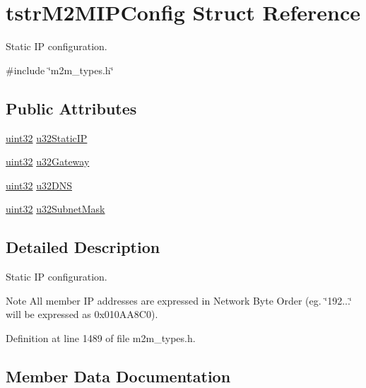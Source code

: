 \hypertarget{structtstrM2MIPConfig}{}\section{tstr\+M2\+M\+I\+P\+Config Struct Reference}
\label{structtstrM2MIPConfig}


Static IP configuration.  




{\ttfamily \#include \char`\"{}m2m\+\_\+types.\+h\char`\"{}}

\subsection*{Public Attributes}
\begin{DoxyCompactItemize}
\item 
\hyperlink{group__DataT_ga100e7c691a47d6978527c479a0158245}{uint32} \hyperlink{structtstrM2MIPConfig_ad98262f0684c0e7a2ab01e8f3e2cce05}{u32\+Static\+IP}
\item 
\hyperlink{group__DataT_ga100e7c691a47d6978527c479a0158245}{uint32} \hyperlink{structtstrM2MIPConfig_ad42bb813617dd8883f434f242ccebf8a}{u32\+Gateway}
\item 
\hyperlink{group__DataT_ga100e7c691a47d6978527c479a0158245}{uint32} \hyperlink{structtstrM2MIPConfig_a45db4ce212dc54ed9b9247316871ae17}{u32\+D\+NS}
\item 
\hyperlink{group__DataT_ga100e7c691a47d6978527c479a0158245}{uint32} \hyperlink{structtstrM2MIPConfig_aeda2788391789636614f7d125b609f00}{u32\+Subnet\+Mask}
\end{DoxyCompactItemize}


\subsection{Detailed Description}
Static IP configuration. 

\begin{DoxyNote}{Note}
All member IP addresses are expressed in Network Byte Order (eg. \char`\"{}192...\char`\"{} will be expressed as 0x010\+A\+A8\+C0). 
\end{DoxyNote}


Definition at line 1489 of file m2m\+\_\+types.\+h.



\subsection{Member Data Documentation}
\mbox{\label{structtstrM2MIPConfig_a45db4ce212dc54ed9b9247316871ae17}} 

